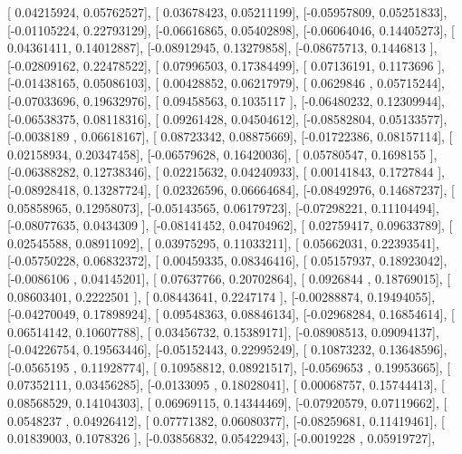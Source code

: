 \documentclass{article}
\begin{document}
       [ 0.04215924,  0.05762527],
       [ 0.03678423,  0.05211199],
       [-0.05957809,  0.05251833],
       [-0.01105224,  0.22793129],
       [-0.06616865,  0.05402898],
       [-0.06064046,  0.14405273],
       [ 0.04361411,  0.14012887],
       [-0.08912945,  0.13279858],
       [-0.08675713,  0.1446813 ],
       [-0.02809162,  0.22478522],
       [ 0.07996503,  0.17384499],
       [ 0.07136191,  0.1173696 ],
       [-0.01438165,  0.05086103],
       [ 0.00428852,  0.06217979],
       [ 0.0629846 ,  0.05715244],
       [-0.07033696,  0.19632976],
       [ 0.09458563,  0.1035117 ],
       [-0.06480232,  0.12309944],
       [-0.06538375,  0.08118316],
       [ 0.09261428,  0.04504612],
       [-0.08582804,  0.05133577],
       [-0.0038189 ,  0.06618167],
       [ 0.08723342,  0.08875669],
       [-0.01722386,  0.08157114],
       [ 0.02158934,  0.20347458],
       [-0.06579628,  0.16420036],
       [ 0.05780547,  0.1698155 ],
       [-0.06388282,  0.12738346],
       [ 0.02215632,  0.04240933],
       [ 0.00141843,  0.1727844 ],
       [-0.08928418,  0.13287724],
       [ 0.02326596,  0.06664684],
       [-0.08492976,  0.14687237],
       [ 0.05858965,  0.12958073],
       [-0.05143565,  0.06179723],
       [-0.07298221,  0.11104494],
       [-0.08077635,  0.0434309 ],
       [-0.08141452,  0.04704962],
       [ 0.02759417,  0.09633789],
       [ 0.02545588,  0.08911092],
       [ 0.03975295,  0.11033211],
       [ 0.05662031,  0.22393541],
       [-0.05750228,  0.06832372],
       [ 0.00459335,  0.08346416],
       [ 0.05157937,  0.18923042],
       [-0.0086106 ,  0.04145201],
       [ 0.07637766,  0.20702864],
       [ 0.0926844 ,  0.18769015],
       [ 0.08603401,  0.2222501 ],
       [ 0.08443641,  0.2247174 ],
       [-0.00288874,  0.19494055],
       [-0.04270049,  0.17898924],
       [ 0.09548363,  0.08846134],
       [-0.02968284,  0.16854614],
       [ 0.06514142,  0.10607788],
       [ 0.03456732,  0.15389171],
       [-0.08908513,  0.09094137],
       [-0.04226754,  0.19563446],
       [-0.05152443,  0.22995249],
       [ 0.10873232,  0.13648596],
       [-0.0565195 ,  0.11928774],
       [ 0.10958812,  0.08921517],
       [-0.0569653 ,  0.19953665],
       [ 0.07352111,  0.03456285],
       [-0.0133095 ,  0.18028041],
       [ 0.00068757,  0.15744413],
       [ 0.08568529,  0.14104303],
       [ 0.06969115,  0.14344469],
       [-0.07920579,  0.07119662],
       [ 0.0548237 ,  0.04926412],
       [ 0.07771382,  0.06080377],
       [-0.08259681,  0.11419461],
       [ 0.01839003,  0.1078326 ],
       [-0.03856832,  0.05422943],
       [-0.0019228 ,  0.05919727],
\end{document}

